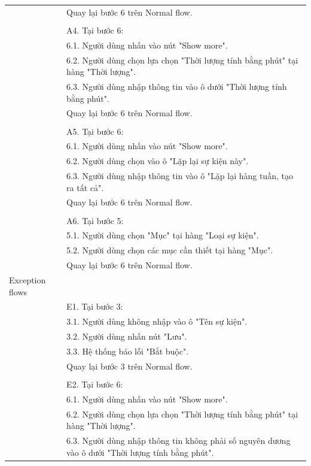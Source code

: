 \documentclass[a4paper, 12pt]{article}
\begin{document}
\begin{table}[H]
\begin{tabular}{|l|p{11cm}|}
        & Quay lại bước 6 trên Normal flow. \\
        & \\
        & A4. Tại bước 6: \\
        & 6.1. Người dùng nhấn vào nút "Show more". \\
        & 6.2. Người dùng chọn lựa chọn "Thời lượng tính bằng phút" tại hàng "Thời lượng". \\
        & 6.3. Người dùng nhập thông tin vào ô dưới "Thời lượng tính bằng phút". \\
        & Quay lại bước 6 trên Normal flow. \\
        & \\
        & A5. Tại bước 6: \\
        & 6.1. Người dùng nhấn vào nút "Show more". \\
        & 6.2. Người dùng chọn vào ô "Lặp lại sự kiện này". \\
        & 6.3. Người dùng nhập thông tin vào ô "Lặp lại hàng tuần, tạo ra tất cả". \\
        & Quay lại bước 6 trên Normal flow. \\
        & \\
        & A6. Tại bước 5: \\
        & 5.1. Người dùng chọn "Mục" tại hàng "Loại sự kiện". \\
        & 5.2. Người dùng chọn các mục cần thiết tại hàng "Mục". \\
        & Quay lại bước 6 trên Normal flow. \\
        \hline
        Exception flows & \\
        & E1. Tại bước 3: \\
        & 3.1. Người dùng không nhập vào ô "Tên sự kiện". \\
        & 3.2. Người dùng nhấn nút "Lưu". \\
        & 3.3. Hệ thống báo lỗi "Bắt buộc". \\
        & Quay lại bước 3 trên Normal flow. \\
        & \\
        & E2. Tại bước 6: \\
        & 6.1. Người dùng nhấn vào nút "Show more". \\
        & 6.2. Người dùng chọn lựa chọn "Thời lượng tính bằng phút" tại hàng "Thời lượng". \\
        & 6.3. Người dùng nhập thông tin không phải số nguyên dương vào ô dưới "Thời lượng tính bằng phút". \\

\end{tabular}
\end{table}
\end{document}
